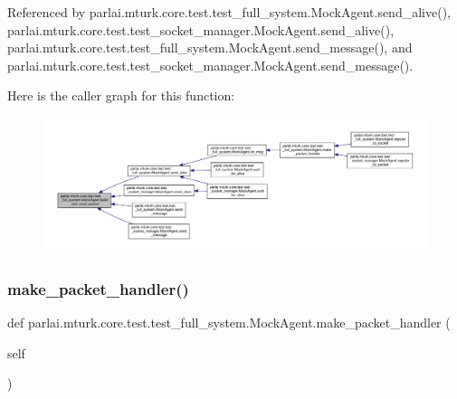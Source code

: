 Referenced by parlai.\+mturk.\+core.\+test.\+test\+\_\+full\+\_\+system.\+Mock\+Agent.\+send\+\_\+alive(), parlai.\+mturk.\+core.\+test.\+test\+\_\+socket\+\_\+manager.\+Mock\+Agent.\+send\+\_\+alive(), parlai.\+mturk.\+core.\+test.\+test\+\_\+full\+\_\+system.\+Mock\+Agent.\+send\+\_\+message(), and parlai.\+mturk.\+core.\+test.\+test\+\_\+socket\+\_\+manager.\+Mock\+Agent.\+send\+\_\+message().

Here is the caller graph for this function\+:
\nopagebreak
\begin{figure}[H]
\begin{center}
\leavevmode
\includegraphics[width=350pt]{classparlai_1_1mturk_1_1core_1_1test_1_1test__full__system_1_1MockAgent_aea4e710be39de9f90e3dd9b9b6882874_icgraph}
\end{center}
\end{figure}
\mbox{\label{classparlai_1_1mturk_1_1core_1_1test_1_1test__full__system_1_1MockAgent_a872f69350ed59fcccfa5819f2bd65337}} 
\subsubsection{\texorpdfstring{make\+\_\+packet\+\_\+handler()}{make\_packet\_handler()}}
{\footnotesize\ttfamily def parlai.\+mturk.\+core.\+test.\+test\+\_\+full\+\_\+system.\+Mock\+Agent.\+make\+\_\+packet\+\_\+handler (\begin{DoxyParamCaption}\item[{}]{self }\end{DoxyParamCaption})}

